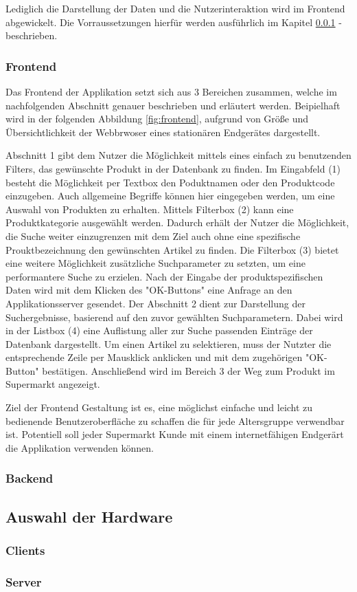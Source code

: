 Lediglich die Darstellung der Daten und die Nutzerinteraktion wird im Frontend abgewickelt.
Die Vorraussetzungen hierfür werden ausführlich im Kapitel \ref{sec:frontend} -  beschrieben.

\subsubsection{Frontend}
\label{sec:frontend}
Das Frontend der Applikation setzt sich aus 3 Bereichen zusammen, welche im nachfolgenden Abschnitt genauer beschrieben und erläutert werden.
Beipielhaft wird in der folgenden Abbildung \ref{fig:frontend}, aufgrund von Größe und Übersichtlichkeit der Webbrwoser eines stationären 
Endgerätes dargestellt.

Abschnitt 1 gibt dem Nutzer die Möglichkeit mittels eines einfach zu benutzenden Filters, das gewünschte Produkt in der Datenbank zu finden.
Im Eingabfeld (1) besteht die Möglichkeit per Textbox den Poduktnamen oder den Produktcode einzugeben. Auch allgemeine Begriffe können hier
eingegeben werden, um eine Auswahl von Produkten zu erhalten. Mittels Filterbox (2) kann eine Produktkategorie ausgewählt werden. Dadurch erhält 
der Nutzer die Möglichkeit, die Suche weiter einzugrenzen mit dem Ziel auch ohne eine spezifische Prouktbezeichnung den gewünschten Artikel 
zu finden. Die Filterbox (3) bietet eine weitere Möglichkeit zusätzliche Suchparameter zu setzten, um eine performantere Suche zu erzielen.
Nach der Eingabe der produktspezifischen Daten wird mit dem Klicken des "OK-Buttons" eine Anfrage an den Applikationsserver gesendet. 
Der Abschnitt 2 dient zur Darstellung der Suchergebnisse, basierend auf den zuvor gewählten Suchparametern. Dabei wird in der Listbox (4) 
eine Auflistung aller zur Suche passenden Einträge der Datenbank dargestellt. Um einen Artikel zu selektieren, muss der Nutzter die entsprechende
Zeile per Mausklick anklicken und mit dem zugehörigen "OK-Button" bestätigen. Anschließend wird im Bereich 3 der Weg zum Produkt im Supermarkt
angezeigt.


Ziel der Frontend Gestaltung ist es, eine möglichst einfache und leicht zu bedienende Benutzeroberfläche zu schaffen die für jede Altersgruppe 
verwendbar ist. Potentiell soll jeder Supermarkt Kunde mit einem internetfähigen Endgerärt die Applikation verwenden können. 



\subsubsection{Backend}
\label{sec:backend}

\subsection{Auswahl der Hardware}
\subsubsection{Clients}
\subsubsection{Server}

